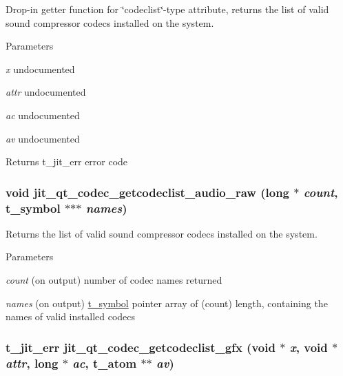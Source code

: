 Drop-\/in getter function for \char`\"{}codeclist\char`\"{}-\/type attribute, returns the list of valid sound compressor codecs installed on the system. 
\begin{DoxyParams}{Parameters}
\item[{\em x}]undocumented \item[{\em attr}]undocumented \item[{\em ac}]undocumented \item[{\em av}]undocumented\end{DoxyParams}
\begin{DoxyReturn}{Returns}
t\_\-jit\_\-err error code 
\end{DoxyReturn}
\hypertarget{group__qtcodecmod_gab22a64fb0e7c3d795aefbbc473d5cb88}{
\subsubsection[{jit\_\-qt\_\-codec\_\-getcodeclist\_\-audio\_\-raw}]{\setlength{\rightskip}{0pt plus 5cm}void jit\_\-qt\_\-codec\_\-getcodeclist\_\-audio\_\-raw (long $\ast$ {\em count}, \/  {\bf t\_\-symbol} $\ast$$\ast$$\ast$ {\em names})}}
\label{group__qtcodecmod_gab22a64fb0e7c3d795aefbbc473d5cb88}


Returns the list of valid sound compressor codecs installed on the system. 
\begin{DoxyParams}{Parameters}
\item[{\em count}](on output) number of codec names returned \item[{\em names}](on output) \hyperlink{structt__symbol}{t\_\-symbol} pointer array of (count) length, containing the names of valid installed codecs \end{DoxyParams}
\hypertarget{group__qtcodecmod_ga2909d3cefe4e70be15966899854f13d7}{
\subsubsection[{jit\_\-qt\_\-codec\_\-getcodeclist\_\-gfx}]{\setlength{\rightskip}{0pt plus 5cm}t\_\-jit\_\-err jit\_\-qt\_\-codec\_\-getcodeclist\_\-gfx (void $\ast$ {\em x}, \/  void $\ast$ {\em attr}, \/  long $\ast$ {\em ac}, \/  {\bf t\_\-atom} $\ast$$\ast$ {\em av})}}
\label{group__qtcodecmod_ga2909d3cefe4e70be15966899854f13d7}



